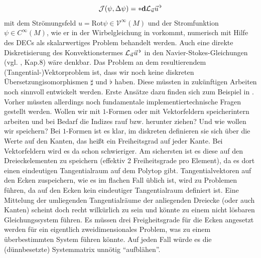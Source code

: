 \begin{fazit}
    \begin{align}
      \mathcal{J}(\psi,\Delta\psi) = *\mathbf{d}\mathcal{L}_{\vec{u}}\vec{u}^{\,\flat} 
    \end{align}
    mit dem Strömungsfeld \( u = \text{Rot}\psi\in\mathcal{V}^{\infty}(M) \) und der Stromfunktion \( \psi\in C^{\infty}(M) \),
    wie er in der Wirbelgleichung in \cite{nitschke} vorkommt, numerisch mit Hilfe des DECs als skalarwertiges Problem behandelt werden.
    Auch eine direkte Diskretisierung des Konvektionstermes \( \mathcal{L}_{\vec{u}}\vec{u}^{\,\flat} \) in den Navier-Stokes-Gleichungen (vgl. \cite{Marsden}, Kap.8) wäre denkbar.
    Das Problem an dem resultierendem (Tangential-)Vektorproblem ist, dass wir noch keine diskreten Übersetzungisomorphismen \( \sharp \) und \( \flat \) haben.
    Diese müssten in zukünftigen Arbeiten noch sinnvoll entwickelt werden.
    Erste Ansätze dazu finden sich zum Beispiel in \cite{hirani}.
    Vorher müssten allerdings noch fundamentale implementiertechnische Fragen gestellt werden.
    Wollen wir mit \( 1 \)-Formen oder mit Vektorfeldern speicherintern arbeiten und bei Bedarf die Indizes rauf bzw. herunter ziehen?
    Und wie wollen wir speichern?
    Bei \( 1 \)-Formen ist es klar, im diskreten definieren sie sich über die Werte auf den Kanten, das heißt ein Freiheitsgrad auf jeder Kante.
    Bei Vektorfeldern wird es da schon schwieriger. Am sichersten ist es diese auf den Dreieckelementen zu speichern (effektiv 2 Freiheitsgrade pro Element), da es dort einen eindeutigen
    Tangentialraum auf dem Polytop gibt. 
    Tangentialvektoren auf den Ecken zuspeichern, wie es im flachen Fall üblich ist, wird zu Problemen führen, da auf den Ecken kein eindeutiger Tangentialraum definiert ist.
    Eine Mittelung der umliegenden Tangentialräume der anliegenden Dreiecke (oder auch Kanten) scheint doch recht wilkürlich zu sein und könnte zu einem nicht lösbaren Gleichungssystem
    führen. Es müssen drei Freigheitsgrade für die Ecken angesetzt werden für ein eigentlich zweidimensionales Problem, was zu einem überbestimmten System führen könnte.
    Auf jeden Fall würde es die (dünnbesetzte) Systemmatrix unnötig "`aufblähen"'.


\end{fazit}
